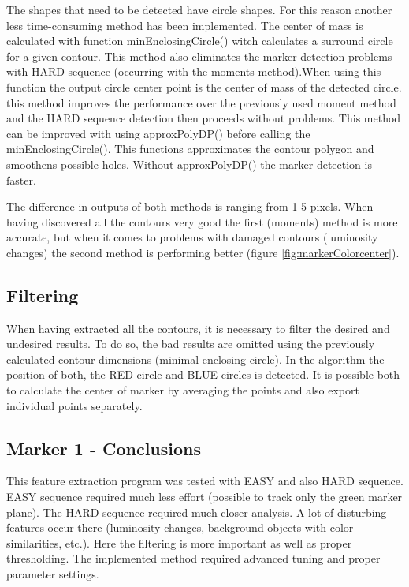 The shapes that need to be detected have circle shapes. For this reason another less time-consuming 
method has been implemented. The center of mass is calculated with function minEnclosingCircle() witch calculates
a surround circle for a given contour. This method also eliminates the marker detection problems with HARD sequence (occurring with
the moments method).When using this function the output circle center point is the center of mass of the detected circle. this method improves the performance over the previously used moment method and the HARD sequence detection then proceeds without problems. This method can be improved with using approxPolyDP() before calling the minEnclosingCircle(). This functions approximates the contour polygon and smoothens possible holes. Without approxPolyDP() the marker detection is faster. 

The difference in outputs of both methods is ranging from 1-5 pixels. When having discovered all the contours very good the first (moments) method is more accurate, but when it comes to problems with damaged contours (luminosity changes) the second method is performing better (figure \ref{fig:markerColorcenter}). 

\subsection{Filtering}

When having extracted all the contours, it is necessary to filter the desired and undesired results. To do so, the bad results are
omitted using the previously calculated contour dimensions (minimal enclosing circle). In the algorithm the position of both, the RED circle and BLUE circles is detected. It is possible both to calculate the center of marker by averaging the points and also export individual points separately. 


\subsection{Marker 1 - Conclusions}
This feature extraction program was tested with EASY and also HARD sequence. EASY sequence required much less effort (possible to track only the green marker plane). The HARD sequence required much closer analysis. A lot of disturbing features occur there (luminosity changes, background objects with color similarities, etc.). Here the filtering is more important as well as proper
thresholding. The implemented method required advanced tuning and proper parameter settings. 

